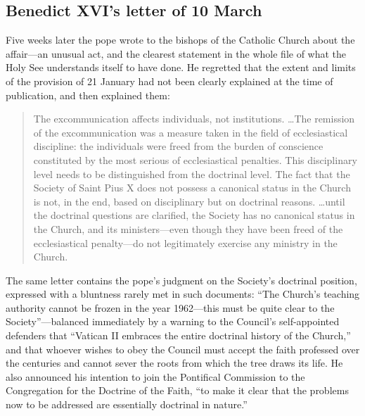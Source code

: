 \subsection{Benedict XVI's letter of 10 March}

Five weeks later the pope wrote to the bishops of the Catholic Church
about the affair---an unusual act, and the clearest statement in the
whole file of what the Holy See understands itself to have done. He
regretted that the extent and limits of the provision of 21 January had
not been clearly explained at the time of publication, and then explained
them:

\begin{quote}\small
The excommunication affects individuals, not institutions. \ldots The
remission of the excommunication was a measure taken in the field of
ecclesiastical discipline: the individuals were freed from the burden of
conscience constituted by the most serious of ecclesiastical penalties.
This disciplinary level needs to be distinguished from the doctrinal
level. The fact that the Society of Saint Pius X does not possess a
canonical status in the Church is not, in the end, based on disciplinary
but on doctrinal reasons. \ldots until the doctrinal questions are
clarified, the Society has no canonical status in the Church, and its
ministers---even though they have been freed of the ecclesiastical
penalty---do not legitimately exercise any ministry in the
Church.
\end{quote}

The same letter contains the pope's judgment on the Society's doctrinal
position, expressed with a bluntness rarely met in such documents: ``The
Church's teaching authority cannot be frozen in the year 1962---this must
be quite clear to the Society''---balanced immediately by a warning to
the Council's self-appointed defenders that ``Vatican II embraces the
entire doctrinal history of the Church,'' and that whoever wishes to obey
the Council must accept the faith professed over the centuries and cannot
sever the roots from which the tree draws its life. He also announced his
intention to join the Pontifical Commission  to the
Congregation for the Doctrine of the Faith, ``to make it clear that the
problems now to be addressed are essentially doctrinal in nature.''

